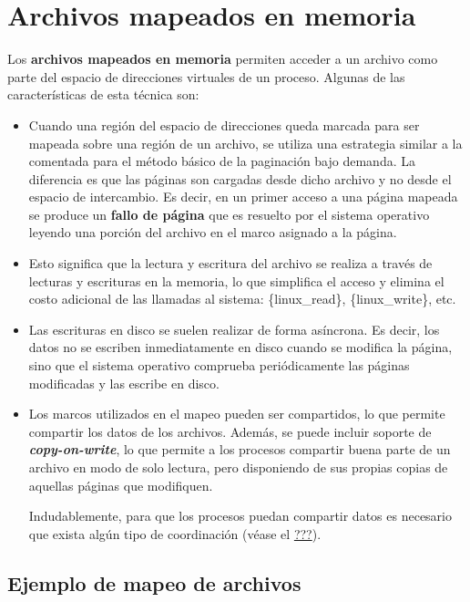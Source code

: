 \section{Archivos mapeados en
memoria}\label{_archivos_mapeados_en_memoria}

{} Los \textbf{archivos mapeados en memoria} permiten acceder a un
archivo como parte del espacio de direcciones virtuales de un proceso.
Algunas de las características de esta técnica son:

\begin{itemize}
\item
  Cuando una región del espacio de direcciones queda marcada para ser
  mapeada sobre una región de un archivo, se utiliza una estrategia
  similar a la comentada para el método básico de la paginación bajo
  demanda. La diferencia es que las páginas son cargadas desde dicho
  archivo y no desde el espacio de intercambio. Es decir, en un primer
  acceso a una página mapeada se produce un \textbf{fallo de página} que
  es resuelto por el sistema operativo leyendo una porción del archivo
  en el marco asignado a la página.
\item
  Esto significa que la lectura y escritura del archivo se realiza a
  través de lecturas y escrituras en la memoria, lo que simplifica el
  acceso y elimina el costo adicional de las llamadas al sistema:
  \{linux\_read\}, \{linux\_write\}, etc.
\item
  Las escrituras en disco se suelen realizar de forma asíncrona. Es
  decir, los datos no se escriben inmediatamente en disco cuando se
  modifica la página, sino que el sistema operativo comprueba
  periódicamente las páginas modificadas y las escribe en disco.
\item
  Los marcos utilizados en el mapeo pueden ser compartidos, lo que
  permite compartir los datos de los archivos. Además, se puede incluir
  soporte de \textbf{\emph{copy-on-write}}, lo que permite a los
  procesos compartir buena parte de un archivo en modo de solo lectura,
  pero disponiendo de sus propias copias de aquellas páginas que
  modifiquen.

  Indudablemente, para que los procesos puedan compartir datos es
  necesario que exista algún tipo de coordinación (véase el
  \hyperref[sincronizaciuxf3n]{???}).
\end{itemize}

\subsection{Ejemplo de mapeo de
archivos}\label{_ejemplo_de_mapeo_de_archivos}

